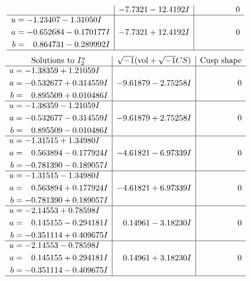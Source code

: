 \documentclass[1p]{elsarticle_modified}
\theoremstyle{definition}
\newcommand{\I}{\sqrt{-1}}
\begin{document}
$$\begin{array}{c|c|c}
 & -7.7321 - 12.4192 I & \phantom{-0.000000 } 0 \\ \hline\begin{aligned}
u &= -1.23407 - 1.31050 I \\
a &= -0.652684 - 0.170177 I \\
b &= \phantom{-}0.864731 - 0.289992 I\end{aligned}
 & -7.7321 + 12.4192 I & \phantom{-0.000000 } 0\\
 \hline 
 \end{array}$$\newpage$$\begin{array}{c|c|c}  
\text{Solutions to }I^u_{2}& \I (\text{vol} + \sqrt{-1}CS) & \text{Cusp shape}\\
 \hline 
\begin{aligned}
u &= -1.38359 + 1.21059 I \\
a &= -0.532677 + 0.314559 I \\
b &= \phantom{-}0.895509 + 0.010486 I\end{aligned}
 & -9.61879 - 2.75258 I & \phantom{-0.000000 } 0 \\ \hline\begin{aligned}
u &= -1.38359 - 1.21059 I \\
a &= -0.532677 - 0.314559 I \\
b &= \phantom{-}0.895509 - 0.010486 I\end{aligned}
 & -9.61879 + 2.75258 I & \phantom{-0.000000 } 0 \\ \hline\begin{aligned}
u &= -1.31515 + 1.34980 I \\
a &= \phantom{-}0.563894 - 0.177924 I \\
b &= -0.781390 - 0.189057 I\end{aligned}
 & -4.61821 - 6.97339 I & \phantom{-0.000000 } 0 \\ \hline\begin{aligned}
u &= -1.31515 - 1.34980 I \\
a &= \phantom{-}0.563894 + 0.177924 I \\
b &= -0.781390 + 0.189057 I\end{aligned}
 & -4.61821 + 6.97339 I & \phantom{-0.000000 } 0 \\ \hline\begin{aligned}
u &= -2.14553 + 0.78598 I \\
a &= \phantom{-}0.145155 - 0.294181 I \\
b &= -0.351114 + 0.409675 I\end{aligned}
 & \phantom{-}0.14961 - 3.18230 I & \phantom{-0.000000 } 0 \\ \hline\begin{aligned}
u &= -2.14553 - 0.78598 I \\
a &= \phantom{-}0.145155 + 0.294181 I \\
b &= -0.351114 - 0.409675 I\end{aligned}
 & \phantom{-}0.14961 + 3.18230 I & \phantom{-0.000000 } 0\\
 \hline 
 \end{array}$$\newpage\newpage\renewcommand{\arraystretch}{1}
\end{document}
